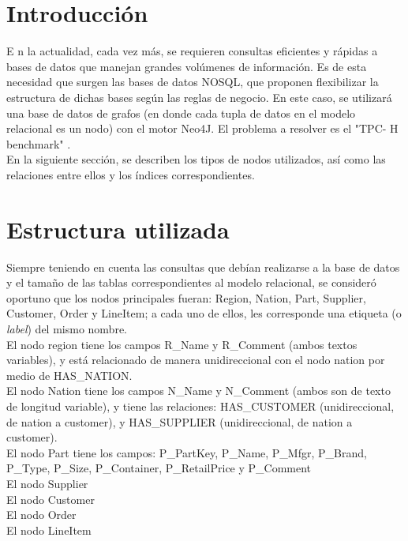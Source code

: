 \documentclass[10pt,journal,compsoc]{IEEEtran}
\begin{document}
\IEEEpeerreviewmaketitle
\section{Introducci\'on}


\lettrine{E}{ }n la actualidad, cada vez m\'as, se requieren consultas eficientes y r\'apidas a bases de datos que manejan grandes vol\'umenes de informaci\'on. Es de esta necesidad que surgen las bases de datos NOSQL, que proponen flexibilizar la estructura de dichas bases seg\'un las reglas de negocio. En este caso, se utilizar\'a una base de datos de grafos (en donde cada tupla de datos en el modelo relacional es un nodo) con el motor Neo4J. El problema a resolver es el "TPC- H benchmark" .\\
En la siguiente secci\'on,  se describen los tipos de nodos utilizados, as\'i como las relaciones entre ellos y los \'indices correspondientes.


\section{Estructura utilizada}
Siempre teniendo en cuenta las consultas que deb\'ian realizarse a la base de datos y el tama\~no de  las tablas correspondientes al modelo relacional, se consider\'o oportuno que los nodos principales fueran: Region, Nation, Part, Supplier, Customer, Order y LineItem; a cada uno de ellos, les corresponde una etiqueta (o \textit{label}) del mismo nombre.\\
El nodo region tiene los campos R\_Name y R\_Comment (ambos textos variables), y est\'a relacionado de manera unidireccional con el nodo nation por medio de HAS\_NATION.\\
El nodo Nation tiene los campos N\_Name y N\_Comment (ambos son de texto de longitud variable), y tiene las relaciones: HAS\_CUSTOMER (unidireccional, de nation a customer), y HAS\_SUPPLIER (unidireccional, de nation a customer).\\
El nodo Part tiene los campos: P\_PartKey, P\_Name, P\_Mfgr, P\_Brand, P\_Type, P\_Size, P\_Container, P\_RetailPrice y P\_Comment \\
El nodo Supplier \\
El nodo Customer  \\
El nodo Order  \\
El nodo LineItem  \\
\end{document}
